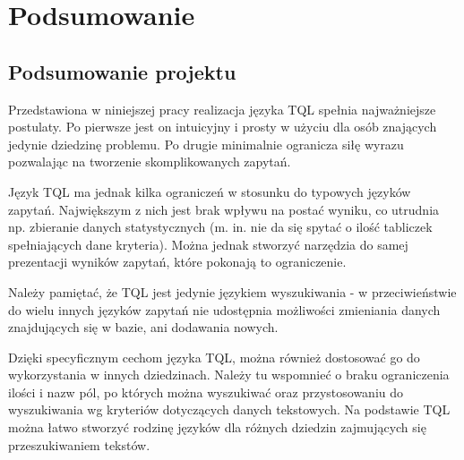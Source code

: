 \chapter*{Podsumowanie}
% 

\section*{Podsumowanie projektu}
Przedstawiona w niniejszej pracy realizacja języka TQL spełnia najważniejsze postulaty. 
Po pierwsze jest on intuicyjny i prosty w użyciu dla osób znających jedynie dziedzinę problemu.
Po drugie minimalnie ogranicza siłę wyrazu pozwalając na tworzenie skomplikowanych zapytań.

Język TQL ma jednak kilka ograniczeń w stosunku do typowych języków zapytań. 
Największym z nich jest brak wpływu na postać wyniku, co utrudnia np. zbieranie danych statystycznych 
(m. in. nie da się spytać o ilość tabliczek spełniających dane kryteria). 
Można jednak stworzyć narzędzia do samej prezentacji wyników zapytań, które pokonają to ograniczenie. 

Należy pamiętać, że TQL jest jedynie językiem wyszukiwania - w przeciwieństwie do wielu innych języków zapytań
nie udostępnia możliwości zmieniania danych znajdujących się w bazie, ani dodawania nowych. 

Dzięki specyficznym cechom języka TQL, można również dostosować go do wykorzystania w innych dziedzinach. 
Należy tu wspomnieć o braku ograniczenia ilości i nazw pól, po których można wyszukiwać oraz przystosowaniu 
do wyszukiwania wg kryteriów dotyczących danych tekstowych. 
Na podstawie TQL można łatwo stworzyć rodzinę języków dla różnych dziedzin zajmujących się przeszukiwaniem tekstów.

